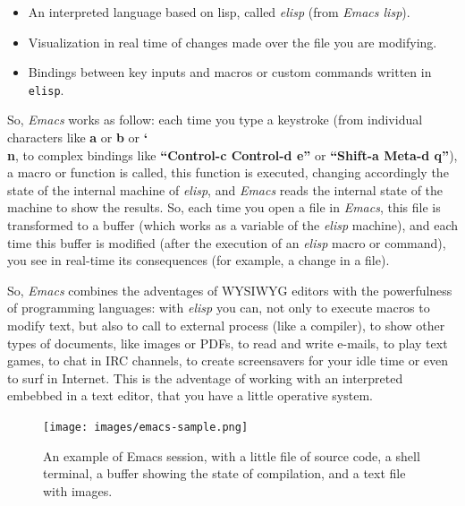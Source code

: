 \documentclass{article}
\begin{document}
\begin{itemize}
\item An interpreted language based on lisp, called \textit{elisp} (from
  \textit{Emacs lisp}).
\item Visualization in real time of changes made over the file you are modifying.
\item Bindings between key inputs and macros or custom commands written in
  \texttt{elisp}.
\end{itemize}

So, \textit{Emacs} works as follow: each time you type a keystroke (from
individual characters like \textbf{a} or \textbf{b} or \textbf{\char`\\ n}, to
complex bindings like \textbf{``Control-c Control-d e''} or \textbf{``Shift-a
  Meta-d q''}), a macro or function is called, this function is executed,
changing accordingly the state of the internal machine of \textit{elisp}, and
\textit{Emacs} reads the internal state of the machine to show the results. So,
each time you open a file in \textit{Emacs}, this file is transformed to a
buffer (which works as a variable of the \textit{elisp} machine), and each time
this buffer is modified (after the execution of an \textit{elisp} macro or
command), you see in real-time its consequences (for example, a change in a
file).

So, \textit{Emacs} combines the adventages of WYSIWYG editors with the
powerfulness of programming languages: with \textit{elisp} you can, not only to
execute macros to modify text, but also to call to external process (like a
compiler), to show other types of documents, like images or PDFs, to read and
write e-mails, to play text games, to chat in IRC channels, to create
screensavers for your idle time or even to surf in Internet. This is the
adventage of working with an interpreted embebbed in a text editor, that you
have a little operative system.

\begin{figure}[h!]
  \begin{center}
    \texttt{[image: images/emacs-sample.png]}
    \caption{An example of Emacs session, with a little file of source code, a shell
      terminal, a buffer showing the state of compilation, and a text file with
      images.}
    \label{fig:emacsess}
  \end{center}
\end{figure}
\end{document}
